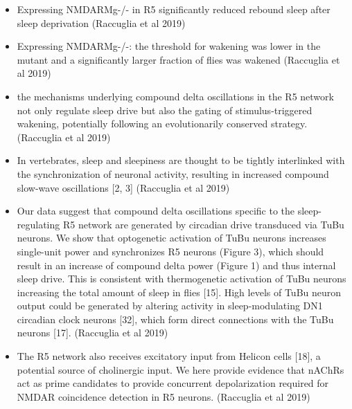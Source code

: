 \documentclass[11pt]{article}
\begin{document}
\begin{itemize}
    \item Expressing NMDARMg-/- in R5 significantly reduced rebound sleep after sleep deprivation
    \parencite{raccugliaNetworkSpecificSynchronizationElectrical2019} (Raccuglia et al 2019)

    \item Expressing NMDARMg-/-: the threshold for wakening was lower in the mutant and a significantly larger fraction of flies was wakened
    \parencite{raccugliaNetworkSpecificSynchronizationElectrical2019} (Raccuglia et al 2019)

    \item the mechanisms underlying compound delta oscillations in the R5 network not only regulate sleep drive but also the gating of stimulus-triggered wakening, potentially following an evolutionarily conserved strategy.
    \parencite{raccugliaNetworkSpecificSynchronizationElectrical2019} (Raccuglia et al 2019)

    \item In vertebrates, sleep and sleepiness are thought to be tightly interlinked with the synchronization of neuronal activity, resulting in increased compound slow-wave oscillations [2, 3]
    \parencite{raccugliaNetworkSpecificSynchronizationElectrical2019} (Raccuglia et al 2019)

    \item Our data suggest that compound delta oscillations specific to the sleep-regulating R5 network are generated by circadian drive transduced via TuBu neurons. We show that optogenetic activation of TuBu neurons increases single-unit power and synchronizes R5 neurons (Figure 3), which should result in an increase of compound delta power (Figure 1) and thus internal sleep drive.
    This is consistent with thermogenetic activation of TuBu neurons increasing the total amount of sleep in flies [15]. High levels of TuBu neuron output could be generated by altering activity in sleep-modulating DN1 circadian clock neurons [32], which form direct connections with the TuBu neurons [17].
    \parencite{raccugliaNetworkSpecificSynchronizationElectrical2019} (Raccuglia et al 2019)

    \item The R5 network also receives excitatory input from Helicon cells [18], a potential source of cholinergic input. We here provide evidence that nAChRs act as prime candidates to provide concurrent depolarization required for NMDAR coincidence detection in R5 neurons.
    \parencite{raccugliaNetworkSpecificSynchronizationElectrical2019} (Raccuglia et al 2019)


\end{itemize}
\end{document}
